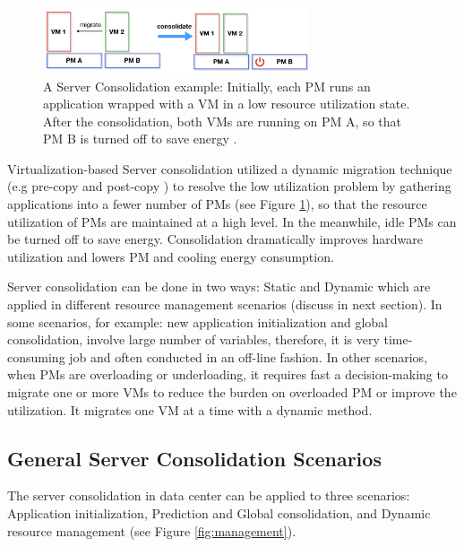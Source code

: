 \begin{figure}
	\centering
	\includegraphics[width=0.7\textwidth]{pics/consolidate.png}
	\caption{A Server Consolidation example: Initially, each PM runs an application wrapped with a VM in a low resource utilization state. After the consolidation, both VMs are running on PM A, so that PM B is turned off to save energy \cite{Barroso:2007jt}.}
	\label{fig:consolidation}
\end{figure}

Virtualization-based Server consolidation \cite{Zhang:2010vo} utilized a dynamic migration technique (e.g pre-copy \cite{Clark:2005ud} and post-copy \cite{Hines:2009fv}) to resolve the low utilization problem by gathering applications into a fewer number of PMs (see Figure \ref{fig:consolidation}), so that the resource utilization of PMs are maintained at a high level. In the meanwhile, idle PMs can be turned off to save energy. Consolidation dramatically improves hardware utilization and lowers PM and cooling energy consumption. 

Server consolidation can be done in two ways: Static and Dynamic \cite{Xiao:2015ik, Verma:2009wi} which are applied in different resource management scenarios (discuss in next section). In some scenarios, for example: new application initialization and global consolidation, involve large number of variables, therefore, it is very time-consuming job and often conducted in an off-line fashion. In other scenarios, when PMs are overloading or underloading, it requires fast a decision-making to migrate one or more VMs to reduce the burden on overloaded PM or improve the utilization. It migrates one VM at a time with a dynamic method. 



\subsection{General Server Consolidation Scenarios}

The server consolidation in data center can be applied to three \cite{Svard:2015ic, Mishra:2012kx} scenarios: Application initialization, Prediction and Global consolidation, and Dynamic resource management (see Figure \ref{fig:management}). 

